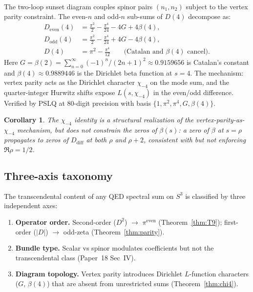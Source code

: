 \documentclass[11pt]{article}
\newtheorem{corollary}{Corollary}
\begin{document}
The two-loop sunset diagram couples spinor pairs $(n_1, n_2)$
subject to the vertex parity constraint.  The even-$n$ and odd-$n$
sub-sums of $D(4)$ decompose as:
\begin{align}
  D_{\mathrm{even}}(4)
    &= \tfrac{\pi^2}{2} - \tfrac{\pi^4}{24}
       - 4G + 4\beta(4),
  \label{eq:D_even_4} \\
  D_{\mathrm{odd}}(4)
    &= \tfrac{\pi^2}{2} - \tfrac{\pi^4}{24}
       + 4G - 4\beta(4),
  \label{eq:D_odd_4} \\
  D(4) &= \pi^2 - \tfrac{\pi^4}{12}
  \qquad\text{(Catalan and $\beta(4)$ cancel)}.
  \label{eq:D_full}
\end{align}
Here $G = \beta(2) = \sum_{n=0}^{\infty} (-1)^n/(2n+1)^2 \approx
0.9159656$ is Catalan's constant and $\beta(4) \approx 0.9889446$ is the
Dirichlet beta function at $s=4$.  The mechanism: vertex parity acts as
the Dirichlet character $\chi_{-4}$ on the mode sum, and the
quarter-integer Hurwitz shifts expose $L(s, \chi_{-4})$ in the
even/odd difference.  Verified by PSLQ at 80-digit precision with
basis $\{1, \pi^2, \pi^4, G, \beta(4)\}$.

\begin{corollary}
The $\chi_{-4}$ identity is a structural realization of the
vertex-parity-as-$\chi_{-4}$ mechanism, but does not constrain
the zeros of $\beta(s)$: a zero of $\beta$ at $s = \rho$ propagates
to zeros of $D_{\mathrm{diff}}$ at both $\rho$ and $\rho + 2$,
consistent with but not enforcing $\Re\rho = 1/2$.
\end{corollary}

\subsection{Three-axis taxonomy}

The transcendental content of any QED spectral sum on $S^3$ is
classified by three independent axes:
\begin{enumerate}
\item \textbf{Operator order.}
      Second-order ($D^2$) $\to$ $\pi^{\mathrm{even}}$ (Theorem~\ref{thm:T9});
      first-order ($|D|$) $\to$ odd-zeta (Theorem~\ref{thm:parity}).
\item \textbf{Bundle type.}
      Scalar vs spinor modulates coefficients but not the
      transcendental class (Paper~18 Sec~IV).
\item \textbf{Diagram topology.}
      Vertex parity introduces Dirichlet $L$-function characters
      ($G$, $\beta(4)$) that are absent from unrestricted sums
      (Theorem~\ref{thm:chi4}).
\end{enumerate}
\end{document}
